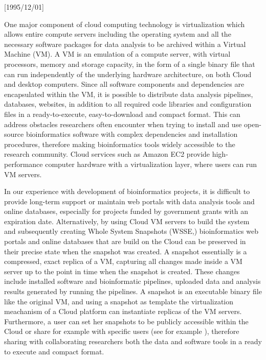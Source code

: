 \NeedsTeXFormat{LaTeX2e}[1995/12/01] \documentclass[10pt]{bmc_article}
\newenvironment{bmcformat}{\begin{raggedright}\baselineskip20pt\sloppy\setboolean{publ}{false}}{\end{raggedright}\baselineskip20pt\sloppy}
\begin{document}
\begin{bmcformat}
One major component of cloud computing technology is virtualization \cite{Uhling2005} which allows entire 
compute servers including the operating system and all the necessary software packages for data analysis 
to be archived within a Virtual Machine (VM). A VM is an emulation of a compute server, with virtual 
processors, memory and storage capacity, in the form of a single binary file that can run 
independently of the underlying hardware architecture, on both Cloud and desktop computers. 
Since all software components and dependencies are encapsulated  within the VM, it is possible to 
distribute data analysis pipelines, databases, websites, in addition to all required code libraries and 
configuration files in a ready-to-execute, easy-to-download and compact format. This can address  
obstacles researchers often encounter when trying to install and use open-source bioinformatics software 
with complex dependencies and installation procedures, therefore making bioinformatics tools widely 
accessible to the research community. Cloud services such as Amazon EC2 \cite{awsec2} provide high-
performance computer hardware with a virtualization layer, where users can run VM servers. 

In our experience with development of bioinformatics projects, it is difficult to provide long-term 
support or maintain web portals with data analysis tools and online databases, especially 
for projects funded by government grants with an expiration date. Alternatively, by using Cloud VM servers
to build the system and subsequently creating Whole System Snapshots (WSSE,\cite{Dudley2010,
Krampis2012}) bioinformatics web portals and online databases that are build on the Cloud can be 
preserved in their precise state when the snapshot was created. A snapshot essentially is a compressed, 
exact replica of a VM, capturing all changes made inside a VM server up to the point in time when the 
snapshot is created. These changes include installed software and bioinformatic pipelines, uploaded data 
and analysis results generated by running the pipelines. A snapshot is an executable binary file like 
the original VM, and using a snapshot as template the virtualization meachanism of a Cloud platform 
can instantiate replicas of the VM servers. Furthermore, a user can set her snapshots to be publicly 
accessible within the Cloud or share for example with specific users (see for example \cite{ebs}), 
therefore sharing with collaborating researchers both the data and software tools in a ready to execute 
and compact format. 


\end{bmcformat}
\end{document}
